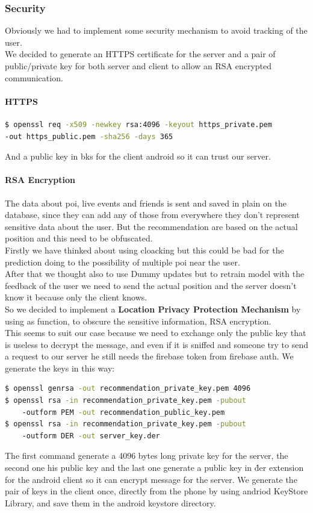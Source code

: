 \documentclass[../../main]{subfiles}
\begin{document}
\subsubsection{Security}
Obviously we had to implement some security mechanism to avoid tracking of the user.\\ We decided to generate an HTTPS certificate for the server and 
a pair of public/private key for both server and client to allow an RSA encrypted communication.
\paragraph{HTTPS}
\begin{lstlisting}[language=bash]
$ openssl req -x509 -newkey rsa:4096 -keyout https_private.pem 
-out https_public.pem -sha256 -days 365
\end{lstlisting}
And a public key in bks for the client android so it can trust our server.
\paragraph*{RSA Encryption}
The data about poi, live events and friends is sent and saved in plain on the database, since they can add any of those from everywhere they don't represent sensitive data about the user.
But the recommendation are based on the actual position and this need to be obfuscated.
\\Firstly we have thinked about using cloacking but this could be bad for the prediction doing to the possibility of multiple poi near the user.
\\After that we thought also to use Dummy updates but to retrain model with the feedback of the user we need to send the actual position and the server doesn't know it because only the client knows.
\\So we decided to implement a \textbf{Location Privacy Protection Mechanism} by using as function, to obscure the sensitive information, RSA encryption.
\\This seems to suit our case because we need to exchange only the public key that is useless to decrypt the message, and even if it is sniffed and someone try to send a request to our server he still needs the firebase token from firebase auth.
\noindent We generate the keys in this way:
\begin{lstlisting}[language=bash]
$ openssl genrsa -out recommendation_private_key.pem 4096
$ openssl rsa -in recommendation_private_key.pem -pubout 
    -outform PEM -out recommendation_public_key.pem 
$ openssl rsa -in recommendation_private_key.pem -pubout 
    -outform DER -out server_key.der
\end{lstlisting}
The first command generate a 4096 bytes long private key for the server, the second one his public key and the last one generate a public key in \.der extension for the android client so it can encrypt message for the server.
We generate the pair of keys in the client once, directly from the phone by using andriod KeyStore Library, and save them in the android keystore directory.
\end{document}
